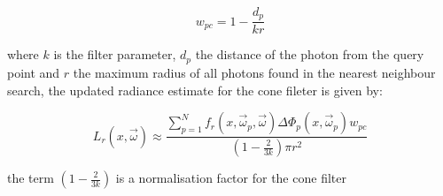 \begin{equation}
w_{pc} = 1 - \frac{d_p}{k r}
\end{equation}

where $k$ is the filter parameter, $d_p$ the distance of the photon from the query point and $r$ the maximum radius of
all photons found in the nearest neighbour search, the updated radiance estimate for the cone fileter is given by:

\begin{equation}
L_r(x, \vec{\omega}) \approx
\frac
{\sum\limits_{p=1}^N f_r(x, \vec{\omega}_p,\vec{\omega})\Delta \Phi_p(x,\vec{\omega}_p)w_{pc}}
{(1 - \frac{2}{3k})\pi r ^2}
\end{equation}

the term $(1 - \frac{2}{3k})$ is a normalisation factor for the cone filter \cite{Foley97}



